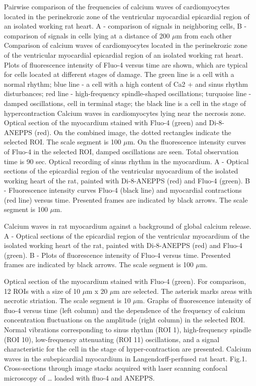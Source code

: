 \documentclass{biophys-new}
\begin{document}
Pairwise comparison of the frequencies of calcium waves of cardiomyocytes located in the perinekrozic zone of the ventricular myocardial epicardial region of an isolated working rat heart. A - comparison of signals in neighboring cells, B - comparison of signals in cells lying at a distance of 200 $\mu$m from each other
Comparison of calcium waves of cardiomyocytes located in the perinekrozic zone of the ventricular myocardial epicardial region of an isolated working rat heart. Plots of fluorescence intensity of Fluo-4 versus time are shown, which are typical for cells located at different stages of damage. The green line is a cell with a normal rhythm; blue line - a cell with a high content of Ca2 + and sinus rhythm disturbances; red line - high-frequency spindle-shaped oscillations; turquoise line - damped oscillations, cell in terminal stage; the black line is a cell in the stage of hypercontraction
Calcium waves in cardiomyocytes lying near the necrosis zone. Optical section of the myocardium stained with Fluo-4 (green) and Di-8-ANEPPS (red). On the combined image, the dotted rectangles indicate the selected ROI. The scale segment is 100 $\mu$m. On the fluorescence intensity curves of Fluo-4 in the selected ROI, damped oscillations are seen. Total observation time is 90 sec.
Optical recording of sinus rhythm in the myocardium. A - Optical sections of the epicardial region of the ventricular myocardium of the isolated working heart of the rat, painted with Di-8-ANEPPS (red) and Fluo-4 (green). B - Fluorescence intensity curves Fluo-4 (black line) and myocardial contractions (red line) versus time. Presented frames are indicated by black arrows. The scale segment is 100 $\mu$m.

Calcium waves in rat myocardium against a background of global calcium release. A - Optical sections of the epicardial region of the ventricular myocardium of the isolated working heart of the rat, painted with Di-8-ANEPPS (red) and Fluo-4 (green). B - Plots of fluorescence intensity of Fluo-4 versus time. Presented frames are indicated by black arrows. The scale segment is 100 $\mu$m.

Optical section of the myocardium stained with Fluo-4 (green).
For comparison, 12 ROIs with a size of 10 $\mu$m x 20 $\mu$m are selected.
The asterisk marks areas with necrotic striation. The scale segment is 10 $\mu$m.
Graphs of fluorescence intensity of fluo-4 versus time (left column) and the dependence of the frequency of calcium concentration fluctuations on the amplitude (right column) in the selected ROI.
Normal vibrations corresponding to sinus rhythm (ROI 1), high-frequency spindle (ROI 10), low-frequency attenuating (ROI 11) oscillations, and a signal characteristic for the cell in the stage of hyper-contraction are presented.
Calcium waves in the subepicardial myocardium in Langendorff-perfused rat heart. Fig.1. Cross-sections through image stacks acquired with laser scanning confocal microscopy of … loaded with fluo-4 and ANEPPS.
\end{document}
